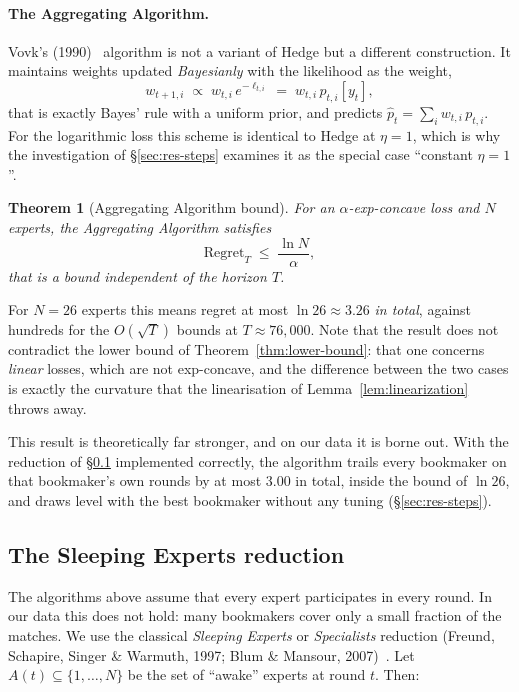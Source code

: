 \documentclass[12pt,a4paper,oneside]{report}
\renewcommand{\_}{\oldunderscore\allowbreak}
\theoremstyle{definition}
\theoremstyle{plain}
\newtheorem{theorem}{Theorem}[chapter]
\theoremstyle{definition}   %
\begin{document}
\paragraph{The Aggregating Algorithm.} Vovk's (1990)~\cite{vovk1990} algorithm is not a variant of Hedge but a
different construction. It maintains weights updated \emph{Bayesianly} with the likelihood as
the weight,
\[
w_{t+1,i} \;\propto\; w_{t,i}\, e^{-\ell_{t,i}} \;=\; w_{t,i}\, p_{t,i}[y_t],
\]
that is exactly Bayes' rule with a uniform prior, and predicts
$\hat{p}_t = \sum_i w_{t,i}\,p_{t,i}$. For the logarithmic loss this scheme is identical to
Hedge at $\eta=1$, which is why the investigation of \S\ref{sec:res-steps} examines it as the
special case ``constant $\eta=1$''.

\begin{theorem}[Aggregating Algorithm bound]
\label{thm:aa}
For an $\alpha$-exp-concave loss and $N$ experts, the Aggregating Algorithm satisfies
\[
\mathrm{Regret}_T \;\leq\; \frac{\ln N}{\alpha},
\]
that is a bound \emph{independent of the horizon} $T$.
\end{theorem}

For $N=26$ experts this means regret at most $\ln 26 \approx 3.26$ \emph{in total}, against
hundreds for the $O(\sqrt{T})$ bounds at $T\approx 76{,}000$. Note that the result does not
contradict the lower bound of Theorem~\ref{thm:lower-bound}: that one concerns \emph{linear}
losses, which are not exp-concave, and the difference between the two cases is exactly the
curvature that the linearisation of Lemma~\ref{lem:linearization} throws away.

This result is theoretically far stronger, and on our data it is borne out. With the reduction
of \S\ref{sec:sleeping} implemented correctly, the algorithm trails every bookmaker on that
bookmaker's own rounds by at most $3.00$ in total, inside the bound of $\ln 26$, and draws level
with the best bookmaker without any tuning (\S\ref{sec:res-steps}).

\subsection{The Sleeping Experts reduction}
\label{sec:sleeping}

The algorithms above assume that every expert participates in every round. In our data this
does not hold: many bookmakers cover only a small fraction of the matches. We use the classical
\emph{Sleeping Experts} or \emph{Specialists} reduction (Freund, Schapire, Singer \& Warmuth,
1997; Blum \& Mansour, 2007)~\cite{freund1997,blum2007}. Let $A(t) \subseteq \{1,\dots,N\}$ be the set of ``awake''
experts at round $t$. Then:
\end{document}
